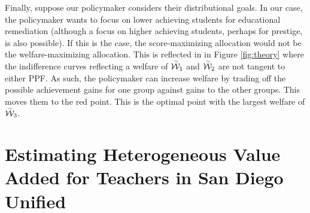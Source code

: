\documentclass[12pt]{article}
\theoremstyle{definition}
\theoremstyle{definition}
\theoremstyle{definition}
\theoremstyle{definition}
\begin{document}
Finally, suppose our policymaker considers their distributional goals. In our case, the policymaker wants to focus on lower achieving students for educational remediation (although a focus on higher achieving students, perhaps for prestige, is also possible). If this is the case, the score-maximizing allocation would not be the welfare-maximizing allocation. This is reflected in in Figure \ref{fig:theory} where the indifference curves reflecting a welfare of $\accentset{\sim}{\mathcal{W}}_1$ and $\accentset{\sim}{\mathcal{W}}_2$ are not tangent to either PPF. As such, the policymaker can increase welfare by trading off the possible achievement gains for one group against gains to the other groups. This moves them to the red point. This is the optimal point with the largest welfare of $\accentset{\sim}{\mathcal{W}}_3$. %



\section{Estimating Heterogeneous Value Added for Teachers in San Diego Unified}
\end{document}
